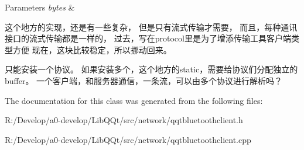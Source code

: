 \begin{DoxyParams}{Parameters}
{\em bytes} & \\
\hline
\end{DoxyParams}
这个地方的实现，还是有一些复杂， 但是只有流式传输才需要， 而且，每种通讯接口的流式传输都是一样的， 过去，写在protocol里是为了增添传输工具客户端类型方便 现在，这块比较稳定，所以挪动回来。

只能安装一个协议。 如果安装多个，这个地方的static，需要给协议们分配独立的buffer。 一个客户端，和服务器通信，一条流，可以由多个协议进行解析吗？

The documentation for this class was generated from the following files\+:\begin{DoxyCompactItemize}
\item 
R\+:/\+Develop/a0-\/develop/\+Lib\+Q\+Qt/src/network/qqtbluetoothclient.\+h\item 
R\+:/\+Develop/a0-\/develop/\+Lib\+Q\+Qt/src/network/qqtbluetoothclient.\+cpp\end{DoxyCompactItemize}

